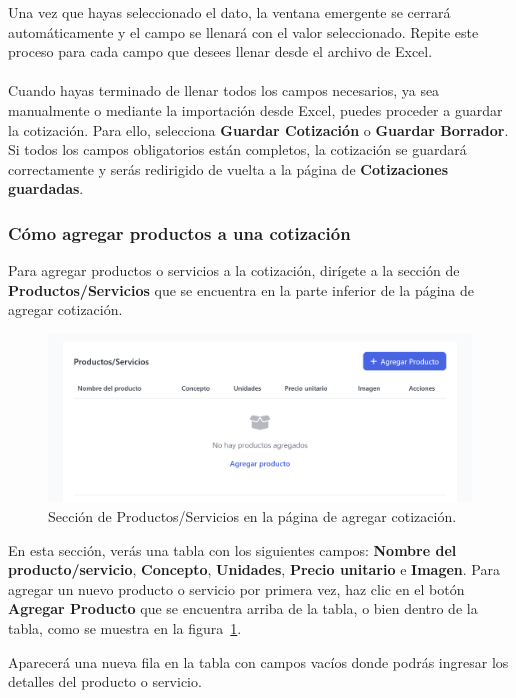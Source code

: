 \documentclass{Pretexto/bluereport}
\begin{document}
\begin{minipage}
Una vez que hayas seleccionado el dato, la ventana emergente se cerrará automáticamente y el campo se llenará 
con el valor seleccionado. Repite este proceso para cada campo que desees llenar desde el archivo de Excel.
\\\\
Cuando hayas terminado de llenar todos los campos necesarios, ya sea manualmente o mediante la importación desde Excel,
puedes proceder a guardar la cotización. Para ello, selecciona \textbf{Guardar Cotización} o \textbf{Guardar Borrador}.
 Si todos los campos obligatorios están completos, la cotización se 
guardará correctamente y serás redirigido de vuelta a la página de \textbf{Cotizaciones guardadas}.

\subsubsection{Cómo agregar productos a una cotización}
Para agregar productos o servicios a la cotización, dirígete a la sección de \textbf{Productos/Servicios} que se encuentra 
en la parte inferior de la página de agregar cotización.
\begin{figure}[H] 
    \centering
        \includegraphics[width=0.75\linewidth]{img/seccion_productos.png}
    \caption{Sección de Productos/Servicios en la página de agregar cotización.}
    \label{fig:seccion_productos}
\end{figure}
En esta sección, verás una tabla con los siguientes campos: \textbf{Nombre del producto/servicio}, \textbf{Concepto}, \textbf{Unidades}, 
\textbf{Precio unitario} e \textbf{Imagen}.
Para agregar un nuevo producto o servicio por primera vez, haz clic en el botón \textbf{Agregar Producto} que se encuentra arriba 
de la tabla, o bien dentro de la tabla, como se muestra en la figura~\ref{fig:seccion_productos}.

Aparecerá una nueva fila en la tabla con campos vacíos donde podrás ingresar los detalles del producto o servicio.


\end{minipage}
\end{document}
